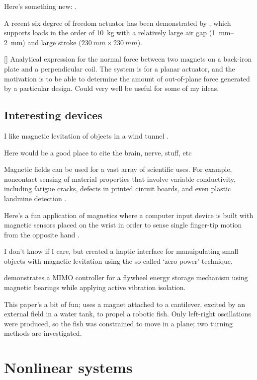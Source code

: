 Here's something new: \textcite{shameli2008}.

A recent six degree of freedom actuator has been demonstrated
by \textcite{jansen2008}, which supports loads in the order of
\SI{10}{kg} with a relatively large air gap (\SI{1}{mm}--\SI{2}{mm}) 
and large stroke ($\SI{230}{mm}\times\SI{230}{mm}$).

[\textcite{dasilveira2005}] Analytical expression for the normal force
between two magnets on a back-iron plate and a perpendicular coil. The system
is for a planar actuator, and the motivation is to be able to determine the
amount of out-of-plane force generated by a particular design. Could very well
be useful for some of my ideas.

\subsection{Interesting devices}

I like magnetic levitation of objects in a wind tunnel
\cite{higuchi2008}.

Here would be a good place to cite the brain, nerve, stuff, etc
\parencite{lu2008,demachi2008}

Magnetic fields can be used for a vast array of scientific uses. For example,
noncontact sensing of material properties that involve variable conductivity,
including fatigue cracks, defects in printed circuit boards, and even plastic
landmine detection \cite{mukhopadhyay2005}.

Here's a fun application of magnetics where a computer input device is built
with magnetic sensors placed on the wrist in order to sense single finger-tip
motion from the opposite hand \parencite{han2008}.

I don't know if I care, but \textcite{vanwest2007} created a
haptic interface for manuipulating small objects with magnetic
levitation using the so-called `zero power' technique.

\textcite{park2008} demonstrates a MIMO controller for a flywheel energy
storage mechanism using magnetic bearings while applying active vibration
isolation.

\textcite{tomie2005} This paper's a bit of fun; uses a magnet attached
to a cantilever, excited by an external field in a water tank, to propel a
robotic fish. Only left-right oscillations were produced, so the fish was
constrained to move in a plane; two turning methods are investigated.

\section{Nonlinear systems}

